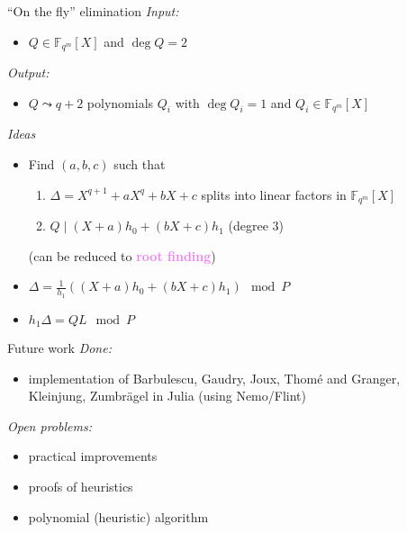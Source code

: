 \documentclass[xcolor=x11names,compress]{beamer}
\theoremstyle{break}
\theoremstyle{sc}
\theoremstyle{definition}
\theoremstyle{remark}
\begin{document}
\begin{frame}{``On the fly'' elimination}
  \emph{Input:}
  \begin{itemize}
    \item $Q\in \mathbb{F}_{q^m}[X]$ and $\deg Q = 2$
  \end{itemize}
  \emph{Output:}
  \begin{itemize}
    \item $Q\leadsto q+2$ polynomials $Q_i$ with $\deg Q_i = 1$ and $Q_i\in
      \mathbb{F}_{q^m}[X]$
  \end{itemize}

  \emph{Ideas}
  \begin{itemize}
    \item Find $(a, b, c)$ such that
      \begin{enumerate}
        \item $\Delta = X^{q+1}+aX^q+bX+c$ splits into linear factors in $\mathbb{F}_{q^m}[X]$
        \item $Q\;|\; (X+a)h_0 + (bX+c)h_1$ (degree $3$)
      \end{enumerate}
      (can be reduced to \textcolor{violet}{\textbf{root finding}})
    \item $ \Delta = \frac{1}{h_1}((X+a)h_0 + (bX+c)h_1)\mod P $
    \item $ h_1\Delta=QL \mod P$
      
  \end{itemize}
\end{frame}

\begin{frame}{Future work}
  \emph{Done:}
  \begin{itemize}
    \item implementation of Barbulescu, Gaudry, Joux, Thomé and Granger,
      Kleinjung, Zumbrägel in Julia (using Nemo/Flint)
  \end{itemize}
  \emph{Open problems:}
  \begin{itemize}
    \item practical improvements
    \item proofs of heuristics
    \item polynomial (heuristic) algorithm
  \end{itemize}

\end{frame}

\end{document}
